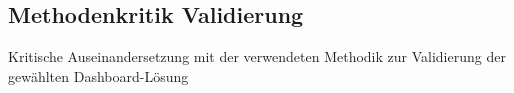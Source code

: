 \subsection{Methodenkritik Validierung}
Kritische Auseinandersetzung mit der verwendeten Methodik zur Validierung der gewählten Dashboard-Lösung


